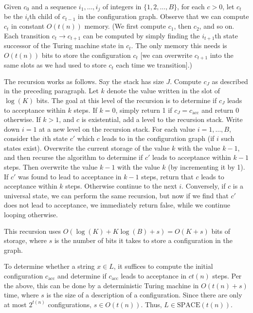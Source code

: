\documentclass{article}
\begin{document}
Given $c_0$ and a sequence $i_1, \dots, i_j$ of integers in $\{1, 2, \dots, B\}$, for each $c > 0$, let $c_t$ be the $i_t$th child of $c_{t - 1}$ in the configuration graph.  Observe that we can compute $c_t$ in constant $O(t(n))$ memory.  (We first compute $c_1$, then $c_2$, and so on.  Each transition $c_t \to c_{t+1}$ can be computed by simply finding the $i_{t+1}$th state successor of the Turing machine state in $c_t$.  The only memory this needs is $O(t(n))$ bits to store the configuration $c_t$ [we can overwrite $c_{t+1}$ into the same slots as we had used to store $c_t$ each time we transition].)

The recursion works as follows.  Say the stack has size $J$.  Compute $c_J$ as described in the preceding paragraph.  Let $k$ denote the value written in the slot of $\log(K)$ bits.  The goal at this level of the recursion is to determine if $c_J$ leads to acceptance within $k$ steps.  If $k = 0$, simply return 1 if $c_J = c_\text{acc}$ and return 0 otherwise.  If $k > 1$, and $c$ is existential, add a level to the recursion stack.  Write down $i = 1$ at a new level on the recursion stack.  For each value $i = 1, \dots, B$, consider the $i$th state $c'$ which $c$ leads to in the configuration graph (if $i$ such states exist).  Overwrite the current storage of the value $k$ with the value $k - 1$, and then recurse the algorithm to determine if $c'$ leads to acceptance within $k - 1$ steps. Then overwrite the value $k - 1$ with the value $k$ (by incrementing it by 1).  If $c'$ was found to lead to acceptance in $k - 1$ steps, return that $c$ leads to acceptance within $k$ steps.  Otherwise continue to the next $i$.  Conversely, if $c$ is a universal state, we can perform the same recursion, but now if we find that $c'$ does not lead to acceptance, we immediately return false, while we continue looping otherwise.

This recursion uses $O(\log(K) + K \log(B) + s) = O(K + s)$ bits of storage, where $s$ is the number of bits it takes to store a configuration in the graph.

To determine whether a string $x \in L$, it suffices to compute the initial configuration $c_\text{acc}$ and determine if $c_\text{acc}$ leads to acceptance in $c t(n)$ steps.  Per the above, this can be done by a deterministic Turing machine in $O(t(n) + s)$ time, where $s$ is the size of a description of a configuration.  Since there are only at most $2^{t(n)}$ configurations, $s \in O(t(n))$.  Thus, $L \in \text{SPACE}(t(n))$.

\end{document}
